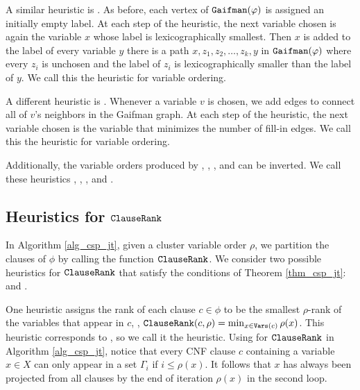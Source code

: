 A similar heuristic is  \cite{koster2001treewidth}.
As before, each vertex of $\texttt{\upshape Gaifman}(\varphi)$ is assigned an initially empty label.
At each step of the heuristic, the next variable chosen is again the variable $x$ whose label is lexicographically smallest.
Then $x$ is added to the label of every variable $y$ \st{} there is a path $x, z_1, z_2, \ldots, z_k, y$ in $\texttt{\upshape Gaifman}(\varphi)$ where every $z_i$ is unchosen and the label of $z_i$ is lexicographically smaller than the label of $y$.
We call this the \Lexm{} heuristic for variable ordering.

A different heuristic is  \cite{dechter2003constraint}.
Whenever a variable $v$ is chosen, we add  edges to connect all of $v$'s neighbors in the Gaifman graph.
At each step of the heuristic, the next variable chosen is the variable that minimizes the number of fill-in edges.
We call this the \Minfill{} heuristic for variable ordering.

Additionally, the variable orders produced by \Mcs{}, \Lexp{}, \Lexm, and \Minfill{} can be inverted.
We call these heuristics \Invmcs, \Invlexp, \Invlexm, and \Invminfill.


\subsection{Heuristics for \texorpdfstring{$\texttt{\upshape ClauseRank}$}{ClauseRank}}

In Algorithm \ref{alg_csp_jt}, given a cluster variable order $\rho$, we partition the clauses of $\phi$ by calling the function $\texttt{\upshape ClauseRank}$.
We consider two possible heuristics for $\texttt{\upshape ClauseRank}$ that satisfy the conditions of Theorem \ref{thm_csp_jt}: \Be{} and \Bm{}.

One heuristic assigns the rank of each clause $c \in \phi$ to be the smallest $\rho$-rank of the variables that appear in $c$, \ie, $\texttt{\upshape ClauseRank}(c, \rho) = \min_{x \in \texttt{\upshape Vars}(c)} \rho(x)$.
This heuristic corresponds to  \cite{dechter1999bucket}, so we call it the \Be{} heuristic.
Using \Be{} for $\texttt{\upshape ClauseRank}$ in Algorithm \ref{alg_csp_jt}, notice that every CNF clause $c$ containing a variable $x \in X$ can only appear in a set $\Gamma_i$ if $i \le \rho(x)$.
It follows that $x$ has always been projected from all clauses by the end of iteration $\rho(x)$ in the second loop.

